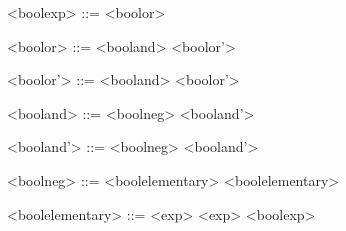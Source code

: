 \begin{grammarEx}
	<bool\textunderscore exp> ::= <bool\textunderscore or> 
	
	<bool\textunderscore or> ::= <bool\textunderscore and> <bool\textunderscore or'> 
	
	<bool\textunderscore or'> ::= \lit{\textbar\textbar} <bool\textunderscore and> <bool\textunderscore or'> 
	\alt \lit{\textepsilon{}} 
	
	<bool\textunderscore and> ::= <bool\textunderscore neg> <bool\textunderscore and'> 
	
	<bool\textunderscore and'> ::= \lit{\&\&} <bool\textunderscore neg> <bool\textunderscore and'> 
	\alt \lit{\textepsilon{}} 
	
	<bool\textunderscore neg> ::= <bool\textunderscore elementary> 
	\alt \lit{~} <bool\textunderscore elementary> 
	
	<bool\textunderscore elementary> ::= <exp> \lit{\textless{}} <exp> 
	\alt {} 
	\alt \lit{[} <bool\textunderscore exp> \lit{]}
\end{grammarEx}